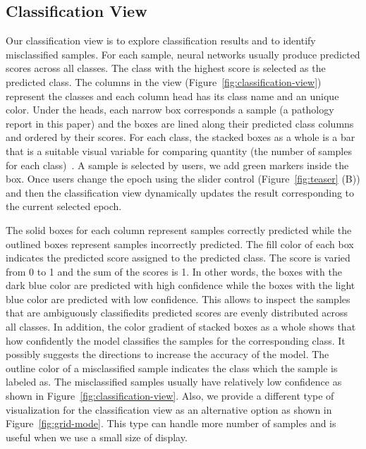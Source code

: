 \subsection{Classification View}
Our classification view is to explore classification results and to identify misclassified samples.
For each sample, neural networks usually produce predicted scores across all classes.
The class with the highest score is selected as the predicted class.
The columns in the view (Figure~\ref{fig:classification-view}) represent the classes and each column head has its class name and an unique color.
Under the heads, each narrow box corresponds a sample (a pathology report in this paper) and the boxes are lined along their predicted class columns and ordered by their scores.
For each class, the stacked boxes as a whole is a bar that is a suitable visual variable for comparing quantity (the number of samples for each class)~\cite{cleveland1984graphical}. 
A sample is selected by users, we add green markers inside the box.
Once users change the epoch using the slider control (Figure~\ref{fig:teaser} (B)) and then the classification view dynamically updates the result corresponding to the current selected epoch.

The solid boxes for each column represent samples correctly predicted while the outlined boxes represent samples incorrectly predicted.
The fill color of each box indicates the predicted score assigned to the predicted class.
The score is varied from 0 to 1 and the sum of the scores is 1.
In other words, the boxes with the dark blue color are predicted with high confidence while the boxes with the light blue color are predicted with low confidence.
This allows to inspect the samples that are ambiguously classified\textemdash its predicted scores are evenly distributed across all classes.
In addition, the color gradient of stacked boxes as a whole shows that how confidently the model classifies the samples for the corresponding class.
It possibly suggests the directions to increase the accuracy of the model.
The outline color of a misclassified sample indicates the class which the sample is labeled as.
The misclassified samples usually have relatively low confidence as shown in Figure~\ref{fig:classification-view}.
Also, we provide a different type of visualization for the classification view as an alternative option as shown in Figure~\ref{fig:grid-mode}.
This type can handle more number of samples and is useful when we use a small size of display.

